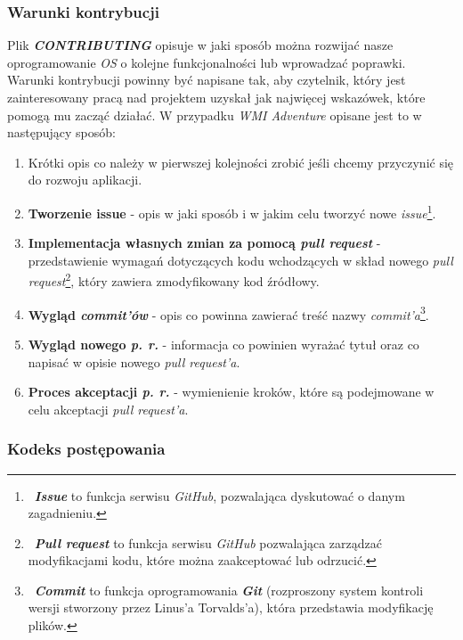 \documentclass{article}
\begin{document}
\subsubsection{Warunki kontrybucji}

\hspace{4mm} Plik \textbf{\emph{CONTRIBUTING}} opisuje w jaki sposób można rozwijać nasze oprogramowanie \emph{OS} o kolejne funkcjonalności lub wprowadzać poprawki. Warunki kontrybucji powinny być napisane tak, aby czytelnik, który jest zainteresowany pracą nad projektem uzyskał jak najwięcej wskazówek, które pomogą mu zacząć działać. W przypadku \emph{WMI Adventure} opisane jest to w następujący sposób:
\begin{enumerate}
    \item Krótki opis co należy w pierwszej kolejności zrobić jeśli chcemy przyczynić się do rozwoju aplikacji.
    \item \textbf{Tworzenie issue} - opis w jaki sposób i w jakim celu tworzyć nowe \emph{issue}\footnote{\, \textbf{\emph{Issue}} to funkcja serwisu \emph{GitHub}, pozwalająca dyskutować o danym zagadnieniu.}.
    \item \textbf{Implementacja własnych zmian za pomocą \emph{pull request}} -\newline przedstawienie wymagań dotyczących kodu wchodzących w skład nowego \emph{pull request}\footnote{\, \textbf{\emph{Pull request}} to funkcja serwisu \emph{GitHub} pozwalająca zarządzać modyfikacjami kodu, które można zaakceptować lub odrzucić.}, który zawiera zmodyfikowany kod źródłowy.
    \item \textbf{Wygląd \emph{commit'ów}} - opis co powinna zawierać treść nazwy \emph{commit'a}\footnote{\, \textbf{\emph{Commit}} to funkcja oprogramowania \textbf{\emph{Git}} (rozproszony system kontroli wersji stworzony przez Linus'a Torvalds'a\cite{git.wiki}), która przedstawia modyfikację plików.}.
    \item \textbf{Wygląd nowego \emph{p. r.}} - informacja co powinien wyrażać tytuł oraz co napisać w opisie nowego \emph{pull request'a}.
    \item \textbf{Proces akceptacji \emph{p. r.}} - wymienienie kroków, które są podejmowane w celu akceptacji \emph{pull request'a}.
\end{enumerate}

\subsubsection{Kodeks postępowania}
\end{document}
